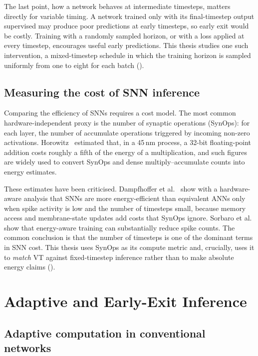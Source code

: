 The last point, how a network behaves at intermediate timesteps, matters directly for variable timing. A network trained only with its final-timestep output supervised may produce poor predictions at early timesteps, so early exit would be costly. Training with a randomly sampled horizon, or with a loss applied at every timestep, encourages useful early predictions. This thesis studies one such intervention, a mixed-timestep schedule in which the training horizon is sampled uniformly from one to eight for each batch ().

\subsection{Measuring the cost of SNN inference}

Comparing the efficiency of SNNs requires a cost model. The most common hardware-independent proxy is the number of synaptic operations (SynOps): for each layer, the number of accumulate operations triggered by incoming non-zero activations. Horowitz~\cite{horowitz2014computing} estimated that, in a 45\,nm process, a 32-bit floating-point addition costs roughly a fifth of the energy of a multiplication, and such figures are widely used to convert SynOps and dense multiply--accumulate counts into energy estimates.

These estimates have been criticised. Dampfhoffer et al.~\cite{dampfhoffer2023snns} show with a hardware-aware analysis that SNNs are more energy-efficient than equivalent ANNs only when spike activity is low and the number of timesteps small, because memory access and membrane-state updates add costs that SynOps ignore. Sorbaro et al.~\cite{sorbaro2020optimizing} show that energy-aware training can substantially reduce spike counts. The common conclusion is that the number of timesteps is one of the dominant terms in SNN cost. This thesis uses SynOps as its compute metric and, crucially, uses it to \emph{match} VT against fixed-timestep inference rather than to make absolute energy claims ().

\section{Adaptive and Early-Exit Inference}
\label{sec:rw-adaptive}

\subsection{Adaptive computation in conventional networks}

